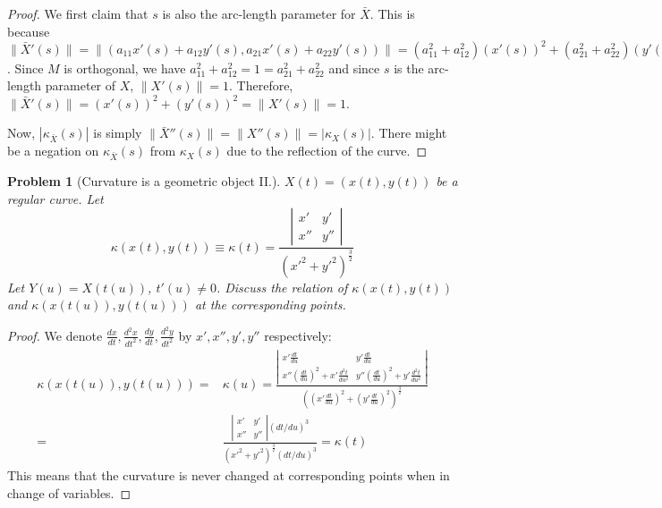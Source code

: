\documentclass[12pt,a4paper]{article}
\newcounter{theProblemCounter}
\newtheorem{problem}[theProblemCounter]{Problem}
\begin{document}
\begin{proof}
We first claim that $s$ is also the arc-length parameter for $\bar{X}$. This is because $\|\bar{X}'(s)\| = \|(a_{11}x'(s)+a_{12}y'(s), a_{21}x'(s)+a_{22}y'(s))\| = (a^2_{11}+a^2_{12})(x'(s))^2+(a^2_{21}+a^2_{22})(y'(s))^2$. Since $M$ is orthogonal, we have $a^2_{11}+a^2_{12}=1=a^2_{21}+a^2_{22}$ and since $s$ is the arc-length parameter of $X$, $\|X'(s)\|=1$. Therefore, $\|\bar{X}'(s)\| = (x'(s))^2+(y'(s))^2 = \|X'(s)\| = 1$.

Now, $|\kappa_{\bar{X}}(s)|$ is simply $\|\bar{X}''(s)\| = \|X''(s)\| = |\kappa_{X}(s)|$. There might be a negation on $\kappa_{\bar{X}}(s)$ from $\kappa_X(s)$ due to the reflection of the curve.
\end{proof}

\begin{problem}[Curvature is a geometric object II.]
$X(t) = (x(t), y(t))$ be a regular curve. Let
\[ \kappa(x(t), y(t)) \equiv \kappa(t) = \frac{
\left|
\begin{array}{cc} x' & y' \\ x'' & y'' \end{array}
\right|
}{(x'^2+y'^2)^\frac32} \]
Let $Y(u) = X(t(u))$, $t'(u)\ne 0$. Discuss the relation of $\kappa(x(t), y(t))$ and $\kappa(x(t(u)), y(t(u)))$ at the corresponding points.
\end{problem}
\begin{proof}
We denote $\frac{dx}{dt}, \frac{d^2x}{dt^2}, \frac{dy}{dt}, \frac{d^2y}{dt^2}$ by $x', x'', y', y''$ respectively:
\begin{align*}
\kappa(x(t(u)), y(t(u))) = & \kappa(u) = \frac{\left|
\begin{array}{cc}
x'\frac{dt}{du} & y'\frac{dt}{du}\\
x''\left(\frac{dt}{du}\right)^2 + x'\frac{d^2t}{du^2} &
y''\left(\frac{dt}{du}\right)^2 + y'\frac{d^2t}{du^2}
\end{array}
\right|}{
\left(\left(x'\frac{dt}{du}\right)^2+\left(y'\frac{dt}{du}\right)^2\right)^\frac32
} \\
= & \frac{
\left|
\begin{array}{cc} x' & y' \\ x'' & y'' \end{array}
\right| (dt/du)^3
}{(x'^2+y'^2)^\frac32 (dt/du)^3} = \kappa(t)
\end{align*}
This means that the curvature is never changed at corresponding points when in change of variables.
\end{proof}
\end{document}
